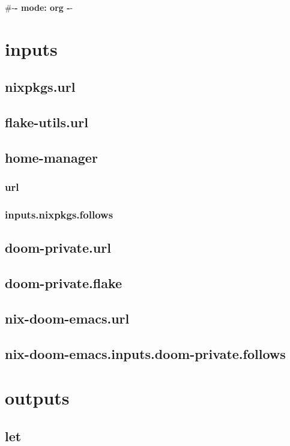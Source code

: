 \documentclass[11pt]{article}
\author{JJ Kim}
\date{\today}
\title{}
\begin{document}
\tableofcontents

\#-\textbf{- mode: org -}-
\section{inputs}
\label{sec:org3889ecc}
\subsection{nixpkgs.url}
\label{sec:orgb007ffb}
\subsection{flake-utils.url}
\label{sec:org9e6676e}
\subsection{home-manager}
\label{sec:org309d50b}
\subsubsection{url}
\label{sec:orge2ccb0a}
\subsubsection{inputs.nixpkgs.follows}
\label{sec:org8f3c9b0}
\subsection{doom-private.url}
\label{sec:org6992ef1}
\subsection{doom-private.flake}
\label{sec:org4cd0f7b}
\subsection{nix-doom-emacs.url}
\label{sec:org917de48}
\subsection{nix-doom-emacs.inputs.doom-private.follows}
\label{sec:org8b9c1ed}

\section{outputs}
\label{sec:orgb2d46a0}
\subsection{let}
\label{sec:org84a99e7}
\end{document}
